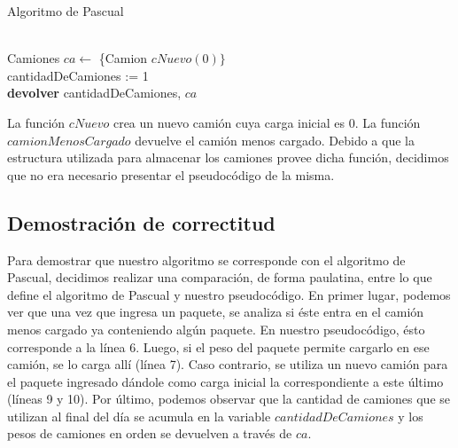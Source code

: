 \begin{algorithm}[H]
	\SetAlgoLined
	\caption{Algoritmo de Pascual}
	\\
	
	Camiones $ca \leftarrow$ \{Camion $cNuevo(0)\}$\\
	cantidadDeCamiones := 1\\
	\textbf{devolver} cantidadDeCamiones, $ca$
\end{algorithm}

La función $cNuevo$ crea un nuevo camión cuya carga inicial es 0.\newline
\newline
La función $camionMenosCargado$ devuelve el camión menos cargado. Debido a que la estructura utilizada para almacenar los camiones provee dicha función, decidimos que no era necesario presentar el pseudocódigo de la misma.\newline

\subsection{Demostración de correctitud}
Para demostrar que nuestro algoritmo se corresponde con el algoritmo de Pascual, decidimos realizar una comparación, de forma paulatina, entre lo que define el algoritmo de Pascual y nuestro pseudocódigo.\newline
\newline
En primer lugar, podemos ver que una vez que ingresa un paquete, se analiza si éste entra en el camión menos cargado ya conteniendo algún paquete. En nuestro pseudocódigo, ésto corresponde a la línea 6.\newline
\newline
Luego, si el peso del paquete permite cargarlo en ese camión, se lo carga allí (línea 7). Caso contrario, se utiliza un nuevo camión para el paquete ingresado dándole como carga inicial la correspondiente a este último (líneas 9 y 10).\newline
\newline
Por último, podemos observar que la cantidad de camiones que se utilizan al final del día se acumula en la variable $cantidadDeCamiones$ y los pesos de camiones en orden se devuelven a través de $ca$.

